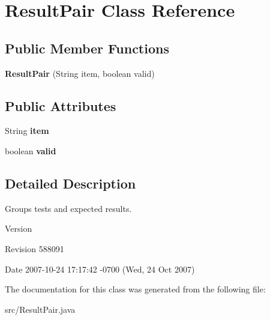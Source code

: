 \hypertarget{classResultPair}{}\section{Result\+Pair Class Reference}
\label{classResultPair}
\subsection*{Public Member Functions}
\begin{DoxyCompactItemize}
\item 
{\bfseries Result\+Pair} (String item, boolean valid)\hypertarget{classResultPair_a68f95e8177e171c52276175c9cfd4496}{}\label{classResultPair_a68f95e8177e171c52276175c9cfd4496}

\end{DoxyCompactItemize}
\subsection*{Public Attributes}
\begin{DoxyCompactItemize}
\item 
String {\bfseries item}\hypertarget{classResultPair_a57f116b1233276d56ac8a725e9b8ee74}{}\label{classResultPair_a57f116b1233276d56ac8a725e9b8ee74}

\item 
boolean {\bfseries valid}\hypertarget{classResultPair_a219ec2c717341670988da0bce0b34fae}{}\label{classResultPair_a219ec2c717341670988da0bce0b34fae}

\end{DoxyCompactItemize}


\subsection{Detailed Description}
Groups tests and expected results.

\begin{DoxyVersion}{Version}

\end{DoxyVersion}
\begin{DoxyParagraph}{Revision}
588091 
\end{DoxyParagraph}
\begin{DoxyParagraph}{Date}
2007-\/10-\/24 17\+:17\+:42 -\/0700 (Wed, 24 Oct 2007) 
\end{DoxyParagraph}


The documentation for this class was generated from the following file\+:\begin{DoxyCompactItemize}
\item 
src/Result\+Pair.\+java\end{DoxyCompactItemize}
